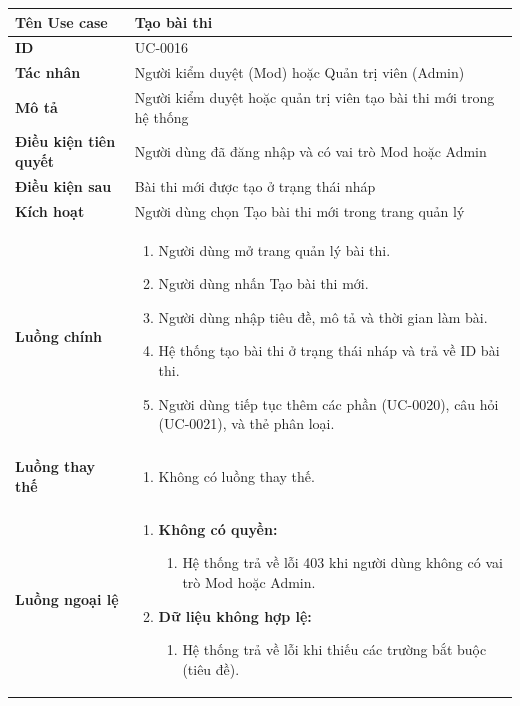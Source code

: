 {
\renewcommand{\arraystretch}{1.5}

\begin{tabularx}{\textwidth}{|>{\raggedright\arraybackslash}X|>{\raggedright\arraybackslash}X|}
\hline
\textbf{Tên Use case} & Tạo bài thi \\
\hline
\textbf{ID} & UC-0016 \\
\hline
\textbf{Tác nhân} & Người kiểm duyệt (Mod) hoặc Quản trị viên (Admin) \\
\hline
\textbf{Mô tả} & Người kiểm duyệt hoặc quản trị viên tạo bài thi mới trong hệ thống \\
\hline
\textbf{Điều kiện tiên quyết} & Người dùng đã đăng nhập và có vai trò Mod hoặc Admin \\
\hline
\textbf{Điều kiện sau} & Bài thi mới được tạo ở trạng thái nháp \\
\hline
\textbf{Kích hoạt} & Người dùng chọn Tạo bài thi mới trong trang quản lý \\
\hline
\textbf{Luồng chính} &
\begin{enumerate}
    \item Người dùng mở trang quản lý bài thi.
    \item Người dùng nhấn Tạo bài thi mới.
    \item Người dùng nhập tiêu đề, mô tả và thời gian làm bài.
    \item Hệ thống tạo bài thi ở trạng thái nháp và trả về ID bài thi.
    \item Người dùng tiếp tục thêm các phần (UC-0020), câu hỏi (UC-0021), và thẻ phân loại.
\end{enumerate} \\
\hline
\textbf{Luồng thay thế} &
\begin{enumerate}
    \item Không có luồng thay thế.
\end{enumerate} \\
\hline
\textbf{Luồng ngoại lệ} &
\begin{enumerate}
    \item \textbf{Không có quyền:}
    \begin{enumerate}
        \item[2Err.] Hệ thống trả về lỗi 403 khi người dùng không có vai trò Mod hoặc Admin.
    \end{enumerate}
    \item \textbf{Dữ liệu không hợp lệ:}
    \begin{enumerate}
        \item[4Err.] Hệ thống trả về lỗi khi thiếu các trường bắt buộc (tiêu đề).
    \end{enumerate}
\end{enumerate} \\
\hline
\end{tabularx}
}
